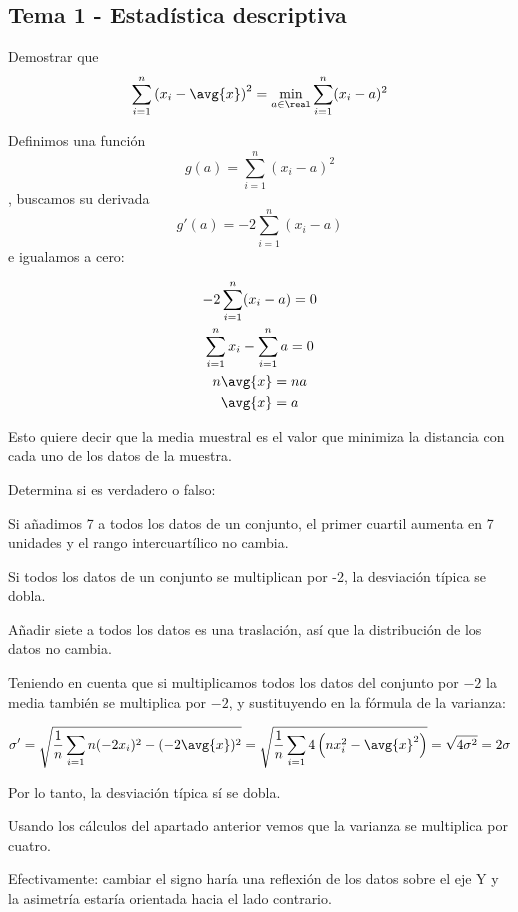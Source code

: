 \documentclass{apuntes}
\begin{document}
\subsection{Tema 1 - Estadística descriptiva}

\begin{problem}[2] Demostrar que \[ \sum_{i=1}^n \left(x_i-\avg{x}\right)^2 = \min_{a\in \real} \sum_{i=1}^n(x_i-a)^2 \]

\solution

Definimos una función \[ g(a) = \sum_{i=1}^n(x_i-a)^2 \], buscamos su derivada \[ g'(a) = -2 \sum_{i=1}^n(x_i-a) \] e igualamos a cero:

\begin{gather*}
-2 \sum_{i=1}^n(x_i-a) = 0 \\
\sum_{i=1}^n x_i - \sum_{i=1}^n a = 0 \\
n \avg{x} = n a \\
\avg{x} = a 
\end{gather*}

Esto quiere decir que la media muestral es el valor que minimiza la distancia con cada uno de los datos de la muestra.
\end{problem}

\begin{problem}[5]Determina si es verdadero o falso:

\ppart Si añadimos 7 a todos los datos de un conjunto, el primer cuartil aumenta en 7 unidades y el rango intercuartílico no cambia.

\ppart Si todos los datos de un conjunto se multiplican por -2, la desviación típica se dobla.
\solution 

\spart Añadir siete a todos los datos es una traslación, así que la distribución de los datos no cambia.

\spart Teniendo en cuenta que si multiplicamos todos los datos del conjunto por $-2$ la media también se multiplica por $-2$, y sustituyendo en la fórmula de la varianza:

\[ \sigma' = \sqrt{\frac{1}{n} \sum_{i=1}n (-2x_i)^2 - (-2\avg{x})^2} = \sqrt{\frac{1}{n} \sum_{i=1}4\left(n x_i^2 - \avg{x}^2\right)} = \sqrt{4\sigma^2} = 2\sigma \]

Por lo tanto, la desviación típica sí se dobla.

\spart Usando los cálculos del apartado anterior vemos que la varianza se multiplica por cuatro.

\spart Efectivamente: cambiar el signo haría una reflexión de los datos sobre el eje Y y la asimetría estaría orientada hacia el lado contrario. 

\end{problem}


\newpage
\printindex
\end{document}
